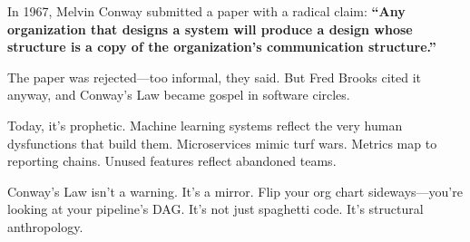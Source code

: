 \begin{tcolorbox}[
  title=Sidebar: Conway’s Law — The Org Chart as Source Code,
  colback=gray!5,
  colframe=black,
  fonttitle=\bfseries,
  sharp corners=south,
  boxrule=0.5pt,
  enhanced,
  breakable
]
In 1967, Melvin Conway submitted a paper with a radical claim: \textbf{“Any organization that designs a system will produce a design whose structure is a copy of the organization’s communication structure.”}

The paper was rejected—too informal, they said. But Fred Brooks cited it anyway, and Conway’s Law became gospel in software circles.

Today, it’s prophetic. Machine learning systems reflect the very human dysfunctions that build them. Microservices mimic turf wars. Metrics map to reporting chains. Unused features reflect abandoned teams. 

Conway’s Law isn’t a warning. It’s a mirror. Flip your org chart sideways—you’re looking at your pipeline’s DAG. It’s not just spaghetti code. It’s structural anthropology.
\end{tcolorbox}

